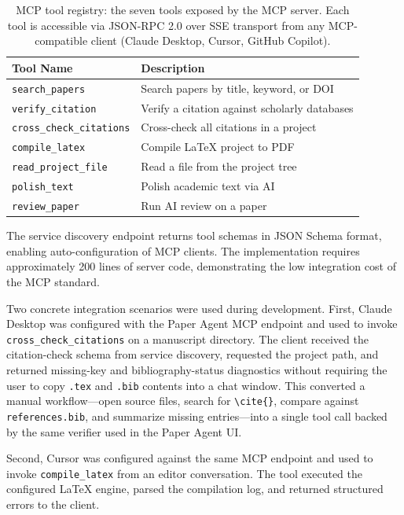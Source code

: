 \begin{table}[htbp]
  \centering
  \caption{MCP tool registry: the seven tools exposed by the \software{} MCP
  server. Each tool is accessible via JSON-RPC 2.0 over SSE transport from any
  MCP-compatible client (Claude Desktop, Cursor, GitHub Copilot).}
  \label{tab:mcp-tools}
  \begin{tabularx}{\textwidth}{L{4cm} L{10cm}}
    \toprule
    \textbf{Tool Name} & \textbf{Description} \\
    \midrule
    \texttt{search\_papers} & Search papers by title, keyword, or DOI \\
    \texttt{verify\_citation} & Verify a citation against scholarly databases \\
    \texttt{cross\_check\_citations} & Cross-check all citations in a project \\
    \texttt{compile\_latex} & Compile \LaTeX{} project to PDF \\
    \texttt{read\_project\_file} & Read a file from the project tree \\
    \texttt{polish\_text} & Polish academic text via AI \\
    \texttt{review\_paper} & Run AI review on a paper \\
    \bottomrule
  \end{tabularx}
\end{table}

The service discovery endpoint returns tool schemas in JSON Schema format,
enabling auto-configuration of MCP clients. The implementation requires
approximately 200 lines of server code, demonstrating the low integration cost
of the MCP standard.

Two concrete integration scenarios were used during development. First, Claude
Desktop was configured with the Paper Agent MCP endpoint and used to invoke
\texttt{cross\_check\_citations} on a manuscript directory. The client received
the citation-check schema from service discovery, requested the project path,
and returned missing-key and bibliography-status diagnostics without requiring
the user to copy \texttt{.tex} and \texttt{.bib} contents into a chat window.
This converted a manual workflow---open source files, search for
\texttt{\textbackslash cite\{\}}, compare against \texttt{references.bib}, and
summarize missing entries---into a single tool call backed by the same verifier
used in the Paper Agent UI.

Second, Cursor was configured against the same MCP endpoint and used to invoke
\texttt{compile\_latex} from an editor conversation. The tool executed the
configured \LaTeX{} engine, parsed the compilation log, and returned structured
errors to the client.

